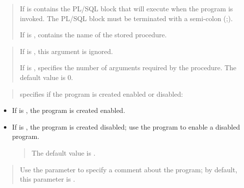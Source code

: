 \documentclass[letterpaper,10pt,english,openany,oneside]{sphinxmanual}
\begin{document}
\begin{quote}

If  is  contains the
PL/SQL block that will execute when the program is invoked. The
PL/SQL block must be terminated with a semi-colon (;).

If  is ,  contains the name
of the stored procedure.
\end{quote}

\begin{quote}

If  is , this argument is ignored.

If  is , 
specifies the number of arguments required by the procedure. The
default value is 0.
\end{quote}

\begin{quote}

 specifies if the program is created enabled or disabled:
\end{quote}
\begin{itemize}
\item {} 
If  is , the program is created enabled.

\item {} 
If  is , the program is created disabled; use the
 program to enable a disabled program.
\begin{quote}

The default value is .
\end{quote}

\end{itemize}

\begin{quote}

Use the  parameter to specify a comment about the program;
by default, this parameter is .
\end{quote}
\end{document}
